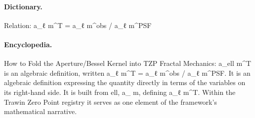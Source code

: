 \paragraph{Dictionary.}
Relation: a\_ℓ m\textasciicircum{}T = a\_ℓ m\textasciicircum{}obs / a\_ℓ m\textasciicircum{}PSF

\paragraph{Encyclopedia.}
How to Fold the Aperture/Bessel Kernel into TZP Fractal Mechanics: a\_ell m\textasciicircum{}T is an algebraic definition, written a\_ℓ m\textasciicircum{}T = a\_ℓ m\textasciicircum{}obs / a\_ℓ m\textasciicircum{}PSF. It is an algebraic definition expressing the quantity directly in terms of the variables on its right-hand side. It is built from ell, a\_ m, defining a\_ℓ m\textasciicircum{}T. Within the Trawin Zero Point registry it serves as one element of the framework's mathematical narrative.
